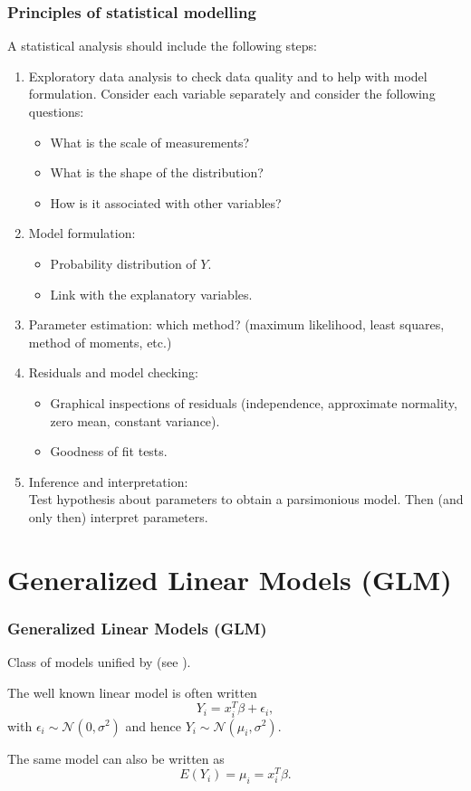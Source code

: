 \documentclass{beamer}
\newcommand{\bs}{\bigskip}
\begin{document}
\begin{frame}[allowframebreaks]
\frametitle{Principles of statistical modelling}

\bs 

A statistical analysis should include the following steps:
\begin{enumerate}
\item {\color{blue}Exploratory data analysis} to check data quality and to help
with model formulation. Consider each variable separately and consider the
following questions:
\begin{itemize}
\item What is the scale of measurements?
\item What is the shape of the distribution?
\item How is it associated with other variables?
\end{itemize}
\item {\color{blue}Model formulation}:
  \begin{itemize}
  \item Probability distribution of $Y$.
  \item Link with the explanatory variables.
  \end{itemize}
\item {\color{blue}Parameter estimation}: which method? (maximum likelihood,
least squares, method of moments, etc.)
\newpage
\item {\color{blue}Residuals and model checking}:
  \begin{itemize}
  \item Graphical inspections of residuals (independence, approximate normality, zero mean, constant variance).
  \item Goodness of fit tests.
  \end{itemize}
\item {\color{blue}Inference and interpretation}:\\
Test hypothesis about parameters to obtain a parsimonious model. Then (and only
then) interpret parameters.
\end{enumerate}

\end{frame}


\section{Generalized Linear Models (GLM)}

\begin{frame}
\frametitle{Generalized Linear Models (GLM)}
Class of models unified by  (see ).

\bs

The well known {\color{blue}linear model} is often written
$$Y_i = x_i^T \beta + \epsilon_i,$$
with $\epsilon_i \sim {\mathcal N}(0,\sigma^2)$ and hence $Y_i \sim {\mathcal N}(\mu_i,\sigma^2)$.

The same model can also be written as
$$E(Y_i) = \mu_i = x_i^T \beta.$$
\end{frame}
\end{document}
